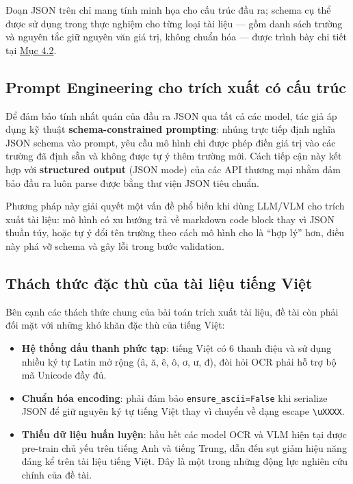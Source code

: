 ﻿\documentclass[12pt]{report}
\begin{document}
Đoạn JSON trên chỉ mang tính minh họa cho cấu trúc đầu ra; schema cụ thể được sử dụng trong thực nghiệm cho từng loại tài liệu --- gồm danh sách trường và nguyên tắc giữ nguyên văn giá trị, không chuẩn hóa --- được trình bày chi tiết tại \hyperref[sec:datasets]{Mục 4.2}.

\subsection{Prompt Engineering cho trích xuất có cấu trúc}\label{sec:prompt_engineering}

Để đảm bảo tính nhất quán của đầu ra JSON qua tất cả các model, tác giả áp dụng kỹ thuật \textbf{schema-constrained prompting}: nhúng trực tiếp định nghĩa JSON schema vào prompt, yêu cầu mô hình chỉ được phép điền giá trị vào các trường đã định sẵn và không được tự ý thêm trường mới. Cách tiếp cận này kết hợp với \textbf{structured output} (JSON mode) của các API thương mại nhằm đảm bảo đầu ra luôn parse được bằng thư viện JSON tiêu chuẩn.

Phương pháp này giải quyết một vấn đề phổ biến khi dùng LLM/VLM cho trích xuất tài liệu: mô hình có xu hướng trả về markdown code block thay vì JSON thuần túy, hoặc tự ý đổi tên trường theo cách mô hình cho là ``hợp lý'' hơn, điều này phá vỡ schema và gây lỗi trong bước validation.

\subsection{Thách thức đặc thù của tài liệu tiếng Việt}\label{sec:vietnamese_challenges}

Bên cạnh các thách thức chung của bài toán trích xuất tài liệu, đề tài còn phải đối mặt với những khó khăn đặc thù của tiếng Việt:

\begin{itemize}
    \item \textbf{Hệ thống dấu thanh phức tạp}: tiếng Việt có 6 thanh điệu và sử dụng nhiều ký tự Latin mở rộng (â, ă, ê, ô, ơ, ư, đ), đòi hỏi OCR phải hỗ trợ bộ mã Unicode đầy đủ.
    \item \textbf{Chuẩn hóa encoding}: phải đảm bảo \texttt{ensure\_ascii=False} khi serialize JSON để giữ nguyên ký tự tiếng Việt thay vì chuyển về dạng escape \texttt{\textbackslash uXXXX}.
    \item \textbf{Thiếu dữ liệu huấn luyện}: hầu hết các model OCR và VLM hiện tại được pre-train chủ yếu trên tiếng Anh và tiếng Trung, dẫn đến sụt giảm hiệu năng đáng kể trên tài liệu tiếng Việt. Đây là một trong những động lực nghiên cứu chính của đề tài.
\end{itemize}
\end{document}
